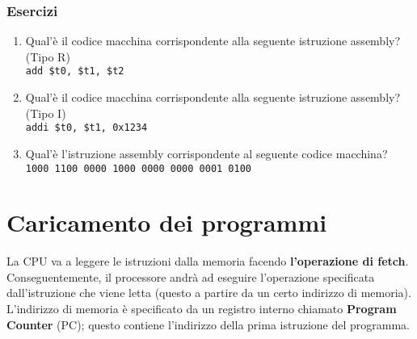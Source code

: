 \documentclass[../main.tex]{subfiles}
\begin{document}
\vspace*{2cm}

\subsection*{Esercizi}
\begin{enumerate}
    \item Qual'è il codice macchina corrispondente alla
    seguente istruzione assembly? (Tipo R)\\
    \texttt{add \$t0, \$t1, \$t2}
    \item Qual'è il codice macchina corrispondente alla
    seguente istruzione assembly? (Tipo I) \\
    \texttt{addi \$t0, \$t1, 0x1234}
    \item Qual'è l'istruzione assembly corrispondente al
    seguente codice macchina? \\
    \texttt{1000 1100 0000 1000 0000 0000 0001 0100}
\end{enumerate}

\newpage

\chapter{Caricamento dei programmi}
La CPU va a leggere le istruzioni dalla memoria facendo \textbf{l'operazione
di fetch}. Conseguentemente, il processore andrà ad eseguire l'operazione
specificata dall'istruzione che viene letta (questo a partire da un
certo indirizzo di memoria). \\
L'indirizzo di memoria è specificato da un registro interno
chiamato \textbf{Program Counter} (PC); questo contiene l'indirizzo della
prima istruzione del programma.
\end{document}
